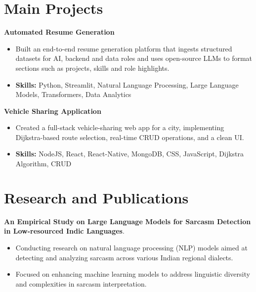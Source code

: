 \documentclass[a4paper,11pt]{article}
\begin{document}
\section{\textbf{Main Projects}}

\vspace{1mm}
  \textbf{Automated Resume Generation  }
\vspace{-1.5mm} %
\begin{itemize}
  \item Built an end-to-end resume generation platform that ingests structured datasets for AI, backend and data roles and uses open-source LLMs to format sections such as projects, skills and role highlights.
\vspace{-3mm}
  \item \textbf{Skills:} Python, Streamlit, Natural Language Processing, Large Language Models, Transformers, Data Analytics
\end{itemize}


\vspace{1mm}
   \textbf{Vehicle Sharing Application }
\vspace{-1.5mm} %
\begin{itemize}
  \item Created a full-stack vehicle-sharing web app for a city, implementing Dijkstra-based route selection, real-time CRUD operations, and a clean UI.
\vspace{-3mm}
  \item \textbf{Skills:} NodeJS, React, React-Native, MongoDB, CSS, JavaScript, Dijkstra Algorithm, CRUD
\end{itemize}



\section{\textbf{Research and Publications} \hfill }
\vspace{1mm}
  \textbf{An Empirical Study on Large Language Models for Sarcasm Detection in Low-resourced Indic Languages}.
\vspace{-1mm} %
\begin{itemize}
  \item Conducting research on natural language processing (NLP) models aimed at detecting and analyzing sarcasm across various Indian regional dialects.
\vspace{-3mm}
  \item Focused on enhancing machine learning models to address linguistic diversity and complexities in sarcasm interpretation.
\end{itemize}
\end{document}
